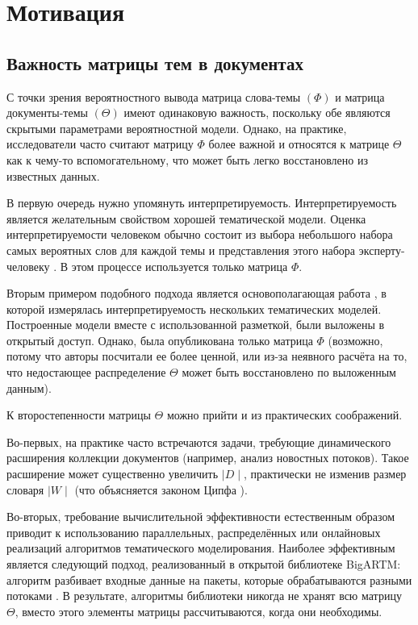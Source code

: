 \section{Мотивация}

\subsection{Важность матрицы тем в документах}
С точки зрения вероятностного вывода матрица слова-темы $(\Phi)$ и матрица документы-темы $(\Theta)$ имеют одинаковую важность, поскольку обе являются скрытыми параметрами вероятностной модели. Однако, на практике, исследователи часто считают матрицу $\Phi$ более важной и относятся к матрице $\Theta$ как к чему-то вспомогательному, что может быть легко восстановлено из известных данных.

В первую очередь нужно упомянуть интерпретируемость. Интерпретируемость является желательным свойством хорошей тематической модели. Оценка интерпретируемости человеком обычно состоит из выбора небольшого набора самых вероятных слов для каждой темы и представления этого набора эксперту-человеку \cite{roder2015exploring}. В этом процессе используется только матрица $\Phi$.

Вторым примером подобного подхода является основополагающая работа \cite{rtl}, в которой измерялась интерпретируемость нескольких тематических моделей. Построенные модели вместе с использованной разметкой, были выложены в открытый доступ. Однако, была опубликована только матрица $\Phi $ (возможно, потому что авторы посчитали ее более ценной, или из-за неявного расчёта на то, что недостающее распределение $\Theta$ может быть восстановлено по выложенным данным).

К второстепенности матрицы $\Theta$ можно прийти и из практических соображений.

Во-первых, на практике часто встречаются задачи, требующие динамического расширения коллекции документов (например, анализ новостных потоков). Такое расширение может существенно увеличить $\mid D\mid$, практически не изменив размер словаря $\mid W \mid$ (что объясняется законом Ципфа ).

Во-вторых, требование вычислительной эффективности естественным образом приводит к использованию параллельных, распределённых или онлайновых реализаций алгоритмов тематического моделирования. Наиболее эффективным является следующий подход, реализованный в открытой библиотеке BigARTM: алгоритм разбивает входные данные на пакеты, которые обрабатываются разными потоками \cite{frei2016parallel}. В результате, алгоритмы библиотеки никогда не хранят всю матрицу $\Theta$, вместо этого элементы матрицы рассчитываются, когда они необходимы.

